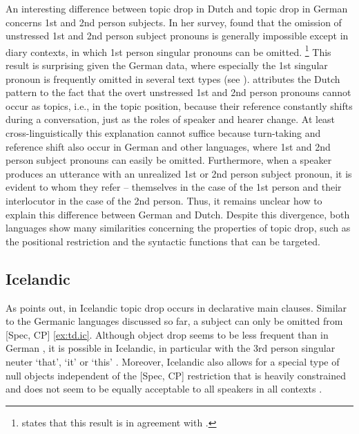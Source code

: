 An interesting difference between topic drop in Dutch and topic drop in German concerns 1st and 2nd person subjects.
In her survey, \citet[60]{thrift2001} found that the omission of unstressed 1st and 2nd person subject pronouns is generally impossible except in diary contexts, in which 1st person singular pronouns can be omitted.%
\footnote{\citet[60]{thrift2001} states that this result is in agreement with \citet{jansen1981}.}
%
This result is surprising given the German data, where especially the 1st singular pronoun is frequently omitted in several text types  (see ).
\citet[72]{thrift2001} attributes the Dutch pattern to the fact that the overt unstressed 1st and 2nd person pronouns cannot occur as topics, i.e., in the topic position, because their reference  constantly shifts during a conversation, just as the roles of speaker and hearer change.
At least cross\hyp linguistically this explanation cannot suffice because turn-taking and reference shift also occur in German and other languages, where 1st and 2nd person subject pronouns can easily be omitted.
Furthermore, when a speaker produces an utterance with an unrealized 1st or 2nd person subject pronoun, it is evident to whom they refer -- themselves in the case of the 1st person and their interlocutor in the case of the 2nd person.
Thus, it remains unclear how to explain this difference between German and Dutch.
Despite this divergence, both languages show many similarities concerning the properties of topic drop, such as the positional restriction and the syntactic functions that can be targeted.

\subsection{Icelandic} 
As \citet{sigurdsson1989} points out, in Icelandic topic drop occurs in declarative main clauses.
Similar to the Germanic languages discussed so far, a subject can only be omitted from [Spec, CP] \ref{ex:td.ic}.
Although object drop seems to be less frequent than in German \citep[142]{sigurdsson1989}, it is possible in Icelandic, in particular with the 3rd person singular neuter `that', `it' or `this' \citep[156]{sigurdsson1989}.
Moreover, Icelandic also allows for a special type of null objects independent of the [Spec, CP] restriction that is heavily constrained and does not seem to be equally acceptable to all speakers in all contexts \citep[152--153]{sigurdsson1989}.

